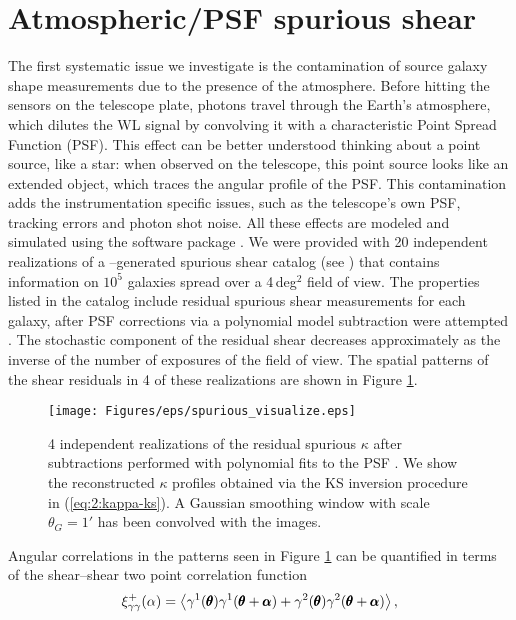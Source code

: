 \section{Atmospheric/PSF spurious shear}
\label{sec:7:spurious}
The first systematic issue we investigate is the contamination of source galaxy shape measurements \citep{PetriSpShear} due to the presence of the atmosphere. Before hitting the sensors on the telescope plate, photons travel through the Earth's atmosphere, which dilutes the WL signal by convolving it with a characteristic Point Spread Function (PSF). This effect can be better understood thinking about a point source, like a star: when observed on the telescope, this point source looks like an extended object, which traces the angular profile of the PSF. This contamination adds the instrumentation specific issues, such as the telescope's own PSF, tracking errors and photon shot noise. All these effects are modeled and simulated using the  software package \citep{LSSTOperations}. We were provided with 20 independent realizations of a --generated spurious shear catalog (see \citep{ChangLSST}) that contains information on $10^5$ galaxies spread over a 4\,deg$^2$ field of view. The properties listed in the catalog include residual spurious shear measurements for each galaxy, after PSF corrections via a polynomial model subtraction were attempted \citep{ChangLSST}. The stochastic component of the residual shear decreases approximately as the inverse of the number of exposures of the field of view. The spatial patterns of the shear residuals in 4 of these realizations are shown in Figure \ref{fig:7:spvisualize}. 
%
\begin{figure}
\begin{center}
\texttt{[image: Figures/eps/spurious\_visualize.eps]}
\end{center}
\caption{4 independent realizations of the residual spurious $\kappa$ after subtractions performed with polynomial fits to the PSF \citep{ChangLSST}. We show the reconstructed $\kappa$ profiles obtained via the KS inversion procedure in (\ref{eq:2:kappa-ks}). A Gaussian smoothing window with scale $\theta_G=1'$ has been convolved with the images.}
\label{fig:7:spvisualize}
\end{figure}
%
Angular correlations in the patterns seen in Figure \ref{fig:7:spvisualize} can be quantified in terms of the shear--shear two point correlation function
\begin{equation}
\label{eq:7:shear2pt}
\xi_{\gamma\gamma}^+(\alpha) = \left\langle\gamma^1(\pmb{\theta})\gamma^1(\pmb{\theta}+\pmb{\alpha})+\gamma^2(\pmb{\theta})\gamma^2(\pmb{\theta}+\pmb{\alpha})\right\rangle,
\end{equation} 
